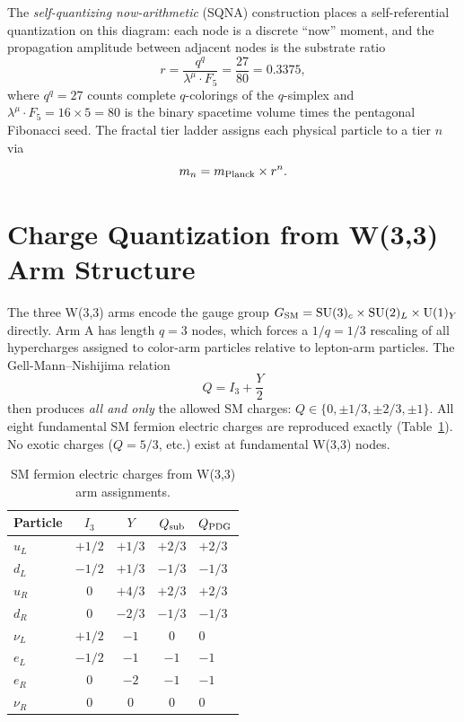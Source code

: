 \documentclass[aps,prl,twocolumn,superscriptaddress,nofootinbib]{revtex4-2}
\begin{document}
The \textit{self-quantizing now-arithmetic} (SQNA) construction places
a self-referential quantization on this diagram: each node is a discrete
``now'' moment, and the propagation amplitude between adjacent nodes is
the substrate ratio
\begin{equation}
r = \frac{q^q}{\lambda^\mu \cdot F_5} = \frac{27}{80} = 0.3375,
\label{eq:r}
\end{equation}
where $q^q=27$ counts complete $q$-colorings of the $q$-simplex
and $\lambda^\mu \cdot F_5 = 16 \times 5 = 80$ is the
binary spacetime volume times the pentagonal Fibonacci seed.
The fractal tier ladder assigns each physical particle to a tier $n$ via
\begin{equation}
m_n = m_{\rm Planck} \times r^n.
\label{eq:ladder}
\end{equation}

\section{Charge Quantization from W(3,3) Arm Structure}

The three W(3,3) arms encode the gauge group
$G_{\rm SM}=\mathrm{SU}(3)_c\times\mathrm{SU}(2)_L\times\mathrm{U}(1)_Y$
directly. Arm A has length $q=3$ nodes, which forces a
$1/q=1/3$ rescaling of all hypercharges assigned to color-arm particles
relative to lepton-arm particles. The Gell-Mann--Nishijima relation
\begin{equation}
Q = I_3 + \frac{Y}{2}
\end{equation}
then produces \textit{all and only} the allowed SM charges:
$Q\in\{0,\pm 1/3,\pm 2/3,\pm 1\}$.
All eight fundamental SM fermion electric charges are reproduced exactly
(Table~\ref{tab:charges}). No exotic charges ($Q=5/3$, etc.) exist at
fundamental W(3,3) nodes.

\begin{table}[h]
\caption{SM fermion electric charges from W(3,3) arm assignments.}
\label{tab:charges}
\begin{ruledtabular}
\begin{tabular}{lcccl}
Particle & $I_3$ & $Y$ & $Q_{\rm sub}$ & $Q_{\rm PDG}$ \\
\hline
$u_L$ & $+1/2$ & $+1/3$ & $+2/3$ & $+2/3$ \\
$d_L$ & $-1/2$ & $+1/3$ & $-1/3$ & $-1/3$ \\
$u_R$ & $0$ & $+4/3$ & $+2/3$ & $+2/3$ \\
$d_R$ & $0$ & $-2/3$ & $-1/3$ & $-1/3$ \\
$\nu_L$ & $+1/2$ & $-1$ & $0$ & $0$ \\
$e_L$ & $-1/2$ & $-1$ & $-1$ & $-1$ \\
$e_R$ & $0$ & $-2$ & $-1$ & $-1$ \\
$\nu_R$ & $0$ & $0$ & $0$ & $0$ \\
\end{tabular}
\end{ruledtabular}
\end{table}
\end{document}
